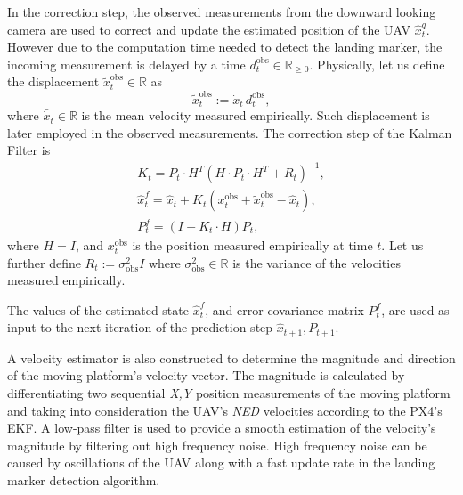 \documentclass[conference]{IEEEtran}
\begin{document}
In the correction step, the observed measurements from the downward
looking camera are used to correct and update the estimated
position of the UAV $\hat{x}_t^q$. However due to the computation time
needed to detect the landing marker, the incoming measurement is
delayed by a time \(d_t^{\text{obs}}\in\mathbb{R}_{\geq 0}\). Physically, let us define the displacement $\tilde{x}_t^{\text{obs}}\in\mathbb{R}$ as
\begin{equation}
  \tilde{x}_t^{\text{obs}}:=\bar{\dot{x}}_t\,d_t^{\text{obs}}, %
\end{equation}
where $\bar{\dot{x}}_t\in\mathbb{R}$ is the mean velocity measured empirically. Such displacement is later employed in the observed measurements. The correction step of the Kalman Filter is
\begin{equation}
    \begin{array}{l}
    
    K_{t} = P_{t}\cdot H^T(H\cdot P_{t}\cdot H^T + R_{t})^{-1}, \\
    \hat{x}_{t}^f = \hat{x}_{t} + K_{t}(x^{\text{obs}}_t+\tilde{x}^{\text{obs}}_t - \hat{x}_{t}), \\ %
    P_{t}^f = (I - K_{t}\cdot H) P_{t},
    \end{array}
\end{equation}
where $H=I$, and $x_t^{\text{obs}}$ is the position measured empirically at time $t$. Let us further define $R_t:=\sigma^{2}_{\text{obs}}I$ where $\sigma^{2}_{\text{obs}}\in\mathbb{R}$ is the variance of the velocities measured empirically. 

The values of the estimated state $\hat{x}_{t}^f$, and error covariance matrix $P_{t}^f$, are used as input to the next iteration of the prediction step $\hat{x}_{t+1},P_{t+1}$.

A velocity estimator is also constructed to determine the magnitude
and direction of the moving platform's velocity vector. The magnitude
is calculated by differentiating two sequential \emph{X,Y} position
measurements of the moving platform and taking into consideration the
UAV's \emph{NED} velocities according to the PX4's EKF. A low-pass
filter is used to provide a smooth estimation of the velocity's
magnitude by filtering out high frequency noise. High frequency noise
can be caused by oscillations of the UAV along with a fast update rate
in the landing marker detection algorithm.  %
\end{document}
